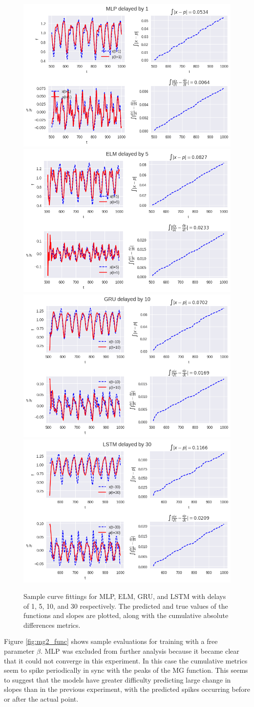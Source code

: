 \documentclass[11pt]{article}
\begin{document}
 \begin{figure}
   \begin{center}
   \includegraphics[width=.48\textwidth]{figures/MLP_1.png}
   \includegraphics[width=.48\textwidth]{figures/ELM_5.png}
   \includegraphics[width=.48\textwidth]{figures/GRU_10.png}
   \includegraphics[width=.48\textwidth]{figures/LSTM_30.png}
 \end{center}
 \caption{Sample curve fittings for MLP, ELM, GRU, and LSTM with
   delays of 1, 5, 10, and 30 respectively. The predicted and true
   values of the functions and slopes are plotted, along with the
   cumulative absolute differences metrics.}
 \label{fig:func_evals}
\end{figure}

Figure \ref{fig:mg2_func} shows sample evaluations for training with a
free parameter $\beta$. MLP was excluded from further analysis because
it became clear that it could not converge in this experiment. In this
case the cumulative metrics seem to spike periodically in sync
with the peaks of the MG function. This seems to suggest that the
models have greater difficulty predicting large change in slopes than
in the previous experiment, with the predicted spikes occurring before
or after the actual point. %
\end{document}
